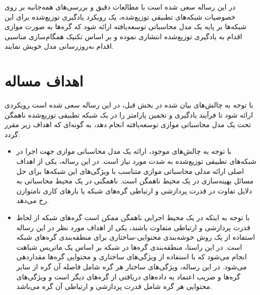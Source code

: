 در این رساله سعی  شده است با مطالعات دقیق و بررسی‌های همه‌جانبه بر روی خصوصیات شبکه‌های تطبیقی توزیع‌شده، یک رویکرد یادگیری توزیع‌شده برای این شبکه‌ها بر پایه یک مدل محاسباتی توسعه‌یافته ارائه شود که گره‌ها به صورت موازی اقدام به یادگیری توزیع‌شده انتشاری نموده و بر اساس تکنیک همگام‌سازی مناسبی اقدام به‌روزرسانی مدل خویش نمایند.

\section{اهداف مساله}
با توجه به چالش‌های بیان شده در بخش قبل، در این رساله سعی شده است رویکردی ارائه شود تا فرآیند یادگیری و تخمین پارامتر را در یک شبکه تطبیقی توزیع‌شده‌ ناهمگن تحت یک مدل محاسباتی موازی توسعه‌یافته انجام دهد، به گونه‌ای که اهداف زیر مقرر گردد:
\begin{itemize}
	\item
	با توجه به چالش‌های موجود، ارائه یک مدل محاسباتی موازی جهت اجرا در شبکه‌های تطبیقی توزیع‌شده‌ به شدت مورد نیاز است. در این رساله، یکی از اهداف اصلی ارائه مدلی محاسباتی موازی متناسب با ویژگی‌های این شبکه‌ها برای حل مسائل بهینه‌سازی در یک محیط ناهمگن است. ناهمگنی در یک محیط محاسباتی به دلایل تفاوت در قدرت پردازشی و ارتباطی گره‌های شبکه یا  بارهای کاری نامتوازن رخ می‌دهد.	
	\item 
	با توجه به اینکه در یک محیط اجرایی ناهمگن ممکن است گره‌های شبکه از لحاظ قدرت پردازشی و ارتباطی متفاوت باشند، یکی از اهداف مورد نظر در این رساله استفاده از یک روش خوشه‌بندی محتوایی-ساختاری برای منطقه‌بندی گره‌های شبکه است. در این راستا، منطقه‌بندی گره‌ها در شبکه بر اساس یک ماتریس شباهت انجام می‌شود که با استفاده از ویژگی‌های ساختاری و محتوایی گره‌ها مقداردهی می‌شود. در این رساله، ویژگی‌های ساختار هر گره شامل فاصله آن گره از سایر گره‌ها و ضریب اعتماد به داده‌های دریافتی از گره‌های دیگر است و ویژگی‌های محتوایی هر گره شامل قدرت پردازشی و ارتباطی آن گره می‌باشد.  


\end{itemize}
